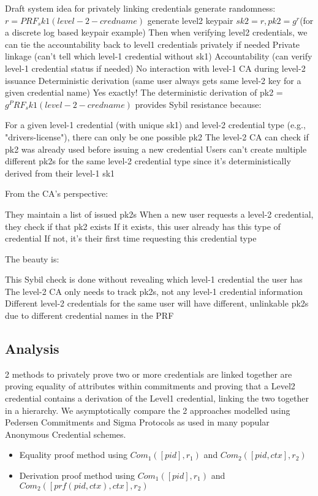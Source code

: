 Draft system idea for privately linking credentials
generate randomness: $r = PRF_sk1(level-2-credname)$
generate level2 keypair $sk2 = r, pk2 = g^r $(for a discrete log based keypair example)
Then when verifying level2 credentials, we can tie the accountability back to level1 credentials privately if needed
Private linkage (can't tell which level-1 credential without sk1)
Accountability (can verify level-1 credential status if needed)
No interaction with level-1 CA during level-2 issuance
Deterministic derivation (same user always gets same level-2 key for a given credential name)
Yes exactly! The deterministic derivation of pk2 = $g^PRF_sk1(level-2-credname)$ provides Sybil resistance because:

For a given level-1 credential (with unique sk1) and level-2 credential type (e.g., "drivers-license"), there can only be one possible pk2
The level-2 CA can check if pk2 was already used before issuing a new credential
Users can't create multiple different pk2s for the same level-2 credential type since it's deterministically derived from their level-1 sk1

From the CA's perspective:

They maintain a list of issued pk2s
When a new user requests a level-2 credential, they check if that pk2 exists
If it exists, this user already has this type of credential
If not, it's their first time requesting this credential type

The beauty is:

This Sybil check is done without revealing which level-1 credential the user has
The level-2 CA only needs to track pk2s, not any level-1 credential information
Different level-2 credentials for the same user will have different, unlinkable pk2s due to different credential names in the PRF


\newpage
\subsection{Analysis}
2 methods to privately prove two or more credentials are linked together are proving equality of attributes within commitments and proving that a Level2 credential contains a derivation of the Level1 credential, linking the two together in a hierarchy. 
We asymptotically compare the 2 approaches modelled using Pedersen Commitments and Sigma Protocols as used in many popular Anonymous Credential schemes.

\begin{itemize}
    \item Equality proof method using $Com_1([pid],r_1)$ and $Com_2([pid,ctx],r_2)$
    \item Derivation proof method using $Com_1([pid],r_1)$ and $Com_2([prf(pid,ctx),ctx],r_2)$
\end{itemize}

